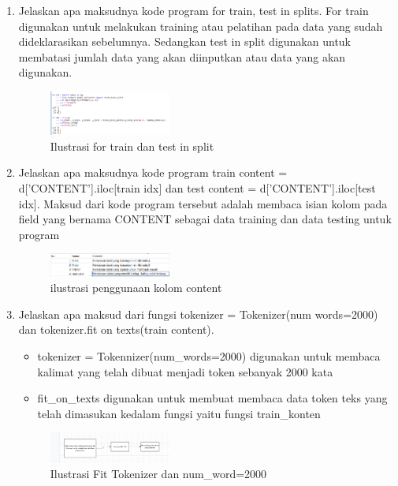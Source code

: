\begin{enumerate}
	\item Jelaskan apa maksudnya kode program for train, test in splits.
	\hfill\break
	For train digunakan untuk melakukan training atau pelatihan pada data yang sudah dideklarasikan sebelumnya. Sedangkan test in split digunakan untuk membatasi jumlah data yang akan diinputkan atau data yang akan digunakan.
    \begin{figure}[H]
        \centering
            \includegraphics[width=4cm]{figures/1174077/7/teori_3.PNG}
            \caption{Ilustrasi for train dan test in split}
        \end{figure}

	\item Jelaskan apa maksudnya kode program train content = d[’CONTENT’].iloc[train idx] dan test content = d[’CONTENT’].iloc[test idx].
	\hfill\break
	Maksud dari kode program tersebut adalah membaca isian kolom pada ﬁeld yang bernama CONTENT sebagai data training dan data testing untuk program 
    \begin{figure}[H]
	\centering
		\includegraphics[width=4cm]{figures/1174077/7/teori_4.PNG}
		\caption{ilustrasi penggunaan kolom content}
	\end{figure}

	\item Jelaskan apa maksud dari fungsi tokenizer = Tokenizer(num words=2000) dan tokenizer.ﬁt on texts(train content).
	\hfill\break
	\begin{itemize}
        \item tokenizer = Tokennizer(num\_words=2000) digunakan untuk membaca kalimat yang telah dibuat menjadi token sebanyak 2000 kata
        \item fit\_on\_texts digunakan untuk membuat membaca data token teks yang telah dimasukan kedalam fungsi yaitu fungsi train\_konten
    \end{itemize}
	\begin{figure}[H]
	\centering
		\includegraphics[width=4cm]{figures/1174077/7/teori_5.PNG}
		\caption{Ilustrasi Fit Tokenizer dan num\_word=2000}
	\end{figure}


\end{enumerate}
